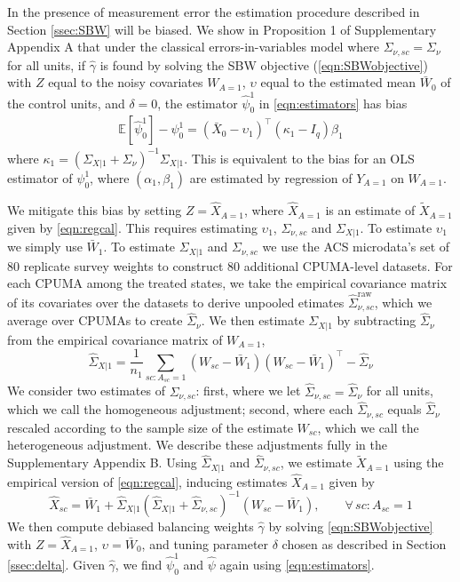\documentclass[aoas]{imsart}
\theoremstyle{plain}
\theoremstyle{remark}
\begin{document}
In the presence of measurement error the estimation procedure described in Section \ref{ssec:SBW} will be biased. We show in Proposition 1 of Supplementary Appendix A that under the classical errors-in-variables model where $\Sigma_{\nu,sc} = \Sigma_{\nu}$ for all units, if $\hat{\gamma}$ is found by solving the SBW objective (\ref{eqn:SBWobjective}) with $Z$ equal to the noisy covariates $W_{A=1}$, $\upsilon$ equal to the estimated mean $\bar{W}_0$ of the control units, and $\delta=0$, the estimator $\hat{\psi}_0^1$ in \eqref{eqn:estimators} has bias
\begin{align*}
\mathbb{E}[\hat{\psi}_0^1] - \psi_0^1 = (\bar{X}_0 - \upsilon_1)^\top(\kappa_1 - I_q)\beta_1 
\end{align*}
where $\kappa_1 = (\Sigma_{X|1} + \Sigma_{\nu})^{-1}\Sigma_{X|1}$. This is equivalent to the bias for an OLS estimator of $\psi_0^1$, where $(\alpha_1, \beta_1)$ are estimated by regression of $Y_{A=1}$ on $W_{A=1}$.

We mitigate this bias by setting $Z = \hat{X}_{A=1}$, where $\hat{X}_{A=1}$ is an estimate of $\tilde{X}_{A=1}$ given by \eqref{eqn:regcal}. This requires estimating $\upsilon_1$, $\Sigma_{\nu, sc}$ and $\Sigma_{X|1}$. To estimate $\upsilon_1$ we simply use $\bar{W}_1$. To estimate $\Sigma_{X|1}$ and $\Sigma_{\nu,sc}$ we use the ACS microdata's set of 80 replicate survey weights to construct 80 additional CPUMA-level datasets. For each CPUMA among the treated states, we take the empirical covariance matrix of its covariates over the datasets to derive unpooled etimates $\hat{\Sigma}_{\nu,sc}^{\text{raw}}$, which we average over CPUMAs to create $\hat{\Sigma}_{\nu}$. We then estimate $\Sigma_{X|1}$ by subtracting $\hat{\Sigma}_{\nu}$ from the empirical covariance matrix of $W_{A=1}$,
\[ \hat{\Sigma}_{X|1} = \frac{1}{n_1} \sum_{sc:A_{sc}=1} (W_{sc} - \bar{W}_1)(W_{sc} - \bar{W}_1)^\top - \hat{\Sigma}_{\nu}\]
We consider two estimates of $\Sigma_{\nu, sc}$: first, where we let $\hat{\Sigma}_{\nu,sc} = \hat{\Sigma}_{\nu}$ for all units, which we call the homogeneous adjustment; second, where each $\hat{\Sigma}_{\nu, sc}$ equals $\hat{\Sigma}_{\nu}$ rescaled according to the sample size of the estimate $W_{sc}$, which we call the heterogeneous adjustment. We describe these adjustments fully in the Supplementary Appendix B. Using $\hat{\Sigma}_{X|1}$ and $\hat{\Sigma}_{\nu, sc}$, we estimate $\tilde{X}_{A=1}$ using the empirical version of \eqref{eqn:regcal}, inducing estimates $\hat{X}_{A=1}$ given by
\begin{equation}\label{eqn:hatX}
\hat{X}_{sc} = \bar{W}_1 + \hat{\Sigma}_{X|1} (\hat{\Sigma}_{X|1} + \hat{\Sigma}_{\nu,sc})^{-1}  (W_{sc} - \bar{W}_1), \qquad \forall\, sc: A_{sc}=1
\end{equation}
We then compute debiased balancing weights $\hat{\gamma}$ by solving \eqref{eqn:SBWobjective} with $Z = \hat{X}_{A=1}$, $\upsilon = \bar{W}_0$, and tuning parameter $\delta$ chosen as described in Section \ref{ssec:delta}. Given $\hat{\gamma}$, we find $\hat{\psi}_0^1$ and $\hat{\psi}$ again using \eqref{eqn:estimators}.
\end{document}
